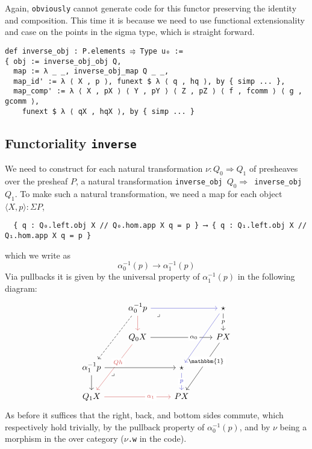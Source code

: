 \documentclass{article}
\renewcommand{\implies}{\Rightarrow}
\newcommand{\al}{\alpha}
\newcommand{\id}[1]{\mathbbm{1}_{#1}}
\newcommand{\<}{\langle}
\renewcommand{\>}{\rangle}
\theoremstyle{definitionstyle}
\theoremstyle{exercisestyle}
\theoremstyle{remarkstyle}
\begin{document}
Again, \texttt{obviously} cannot generate code for this functor preserving
the identity and composition.
This time it is because we need to use functional extensionality and case
on the points in the sigma type, which is straight forward.

\begin{lstlisting}
def inverse_obj : P.elements ⥤ Type u₀ :=
{ obj := inverse_obj_obj Q,
  map := λ _ _, inverse_obj_map Q _ _,
  map_id' := λ ⟨ X , p ⟩, funext $ λ ⟨ q , hq ⟩, by { simp ... },
  map_comp' := λ ⟨ X , pX ⟩ ⟨ Y , pY ⟩ ⟨ Z , pZ ⟩ ⟨ f , fcomm ⟩ ⟨ g , gcomm ⟩,
    funext $ λ ⟨ qX , hqX ⟩, by { simp ... }\end{lstlisting}

\subsection{ Functoriality \texttt{inverse} }

We need to construct for each natural transformation $\nu : Q_{0} \implies Q_{1}$
of presheaves over the presheaf $P$, a natural transformation
\texttt{inverse\_obj $Q_0 \implies $ inverse\_obj $Q_{1}$}.
To make such a natural transformation,
we need a map for each object $\< X , p \> : \Sigma P$,
\begin{lstlisting}
  { q : Q₀.left.obj X // Q₀.hom.app X q = p } ⟶ { q : Q₁.left.obj X // Q₁.hom.app X q = p }
\end{lstlisting}
which we write as
\[ \al_{0}^{-1}(p) \to \al_{1}^{-1}(p)\]
Via pullbacks it is given by the universal property of $\al_{1}^{-1}(p)$
in the following diagram:
\[\begin{tikzcd}
	& {\alpha_0^{-1}p} && \star \\
	& {Q_0 X} && {P X} \\
	{\alpha_1^{-1}p} && \star \\
	{Q_1 X} && {P X}
	\arrow[color={rgb,255:red,92;green,92;blue,214}, from=1-2, to=1-4]
	\arrow["p"{description}, from=1-4, to=2-4]
	\arrow[color={rgb,255:red,214;green,92;blue,92}, from=1-2, to=2-2]
	\arrow["{\alpha_0}"{description, pos=0.7}, from=2-2, to=2-4]
	\arrow[dashed, from=1-2, to=3-1]
	\arrow["Qh"{description, pos=0.4}, color={rgb,255:red,214;green,92;blue,92}, from=2-2, to=4-1]
	\arrow[from=3-1, to=3-3]
	\arrow["{\id{}{}}"{description, pos=0.4}, from=2-4, to=4-3]
	\arrow["{\alpha_1}"{description, pos=0.7}, color={rgb,255:red,214;green,92;blue,92}, from=4-1, to=4-3]
	\arrow[from=3-1, to=4-1]
	\arrow[color={rgb,255:red,92;green,92;blue,214}, from=1-4, to=3-3]
	\arrow["p"{description}, color={rgb,255:red,92;green,92;blue,214}, from=3-3, to=4-3]
	\arrow["\lrcorner"{anchor=center, pos=0.125}, draw=none, from=3-1, to=4-3]
	\arrow["\lrcorner"{anchor=center, pos=0.125}, draw=none, from=1-2, to=2-4]
\end{tikzcd}\]
As before it suffices that the right, back, and bottom sides commute,
which respectively
hold trivially, by the pullback property of $\al_{0}^{-1}(p)$, and
by $\nu$ being a morphism in the over category (\texttt{$\nu$.w} in the code).
\end{document}
